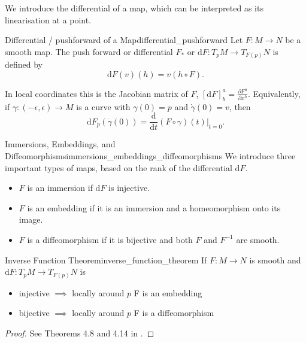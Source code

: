 We introduce the differential of a map, which can be interpreted as its linearisation at a point.

\begin{colordef}{Differential / pushforward of a Map}{differential_pushforward}
Let $F: M \to N$ be a smooth map. The push forward or differential $F_*$ or $\mathrm{d}F: T_pM \to T_{F(p)}N$ is defined by
\[
\mathrm{d}F(v)(h) = v(h \circ F).
\]
\end{colordef}
In local coordinates this is the Jacobian matrix of $F$, $[\mathrm{d}F]^a_b = \tfrac{\partial F^a}{\partial x^b}$. Equivalently, if $\gamma:(-\epsilon,\epsilon)\to M$ is a curve with $\gamma(0)=p$ and $\dot\gamma(0)=v$, then
\[
\mathrm{d}F_p(\dot\gamma(0)) = \frac{\mathrm{d}}{\mathrm{d}t} (F\circ \gamma)(t)\bigg|_{t=0}.
\]

\begin{colordef}{Immersions, Embeddings, and Diffeomorphisms}{immersions_embeddings_diffeomorphisms}
We introduce three important types of maps, based on the rank of the differential $\mathrm{d}F$.
\begin{itemize}
    \item $F$ is an immersion if $\mathrm{d}F$ is injective.
    \item $F$ is an embedding if it is an immersion and a homeomorphism onto its image.
    \item $F$ is a diffeomorphism if it is bijective and both $F$ and $F^{-1}$ are smooth.
\end{itemize}
\end{colordef}

\begin{colortheo}{Inverse Function Theorem}{inverse_function_theorem}
If $F: M \to N$ is smooth and $\mathrm{d}F: T_pM \to T_{F(p)}N$ is 
\begin{itemize}[itemsep=0pt, topsep=0pt]
    \item injective $\implies$ locally around $p$ F is an embedding
    \item bijective $\implies$ locally around $p$ F is a diffeomorphism
\end{itemize}
\end{colortheo}
\begin{proof}
See Theorems 4.8 and 4.14 in \cite{tsakanikas2024dg2}.
\end{proof}















